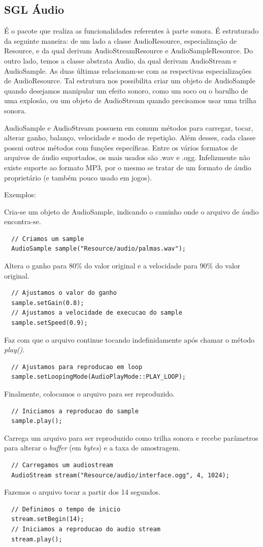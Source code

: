 \subsection{SGL Áudio}
%
%
É o pacote que realiza as funcionalidades referentes à parte sonora. É estruturado da seguinte maneira: de um lado a classe AudioResource, especialização de Resource, e da qual derivam AudioStreamResource e AudioSampleResource. Do outro lado, temos a classe abstrata Audio, da qual derivam AudioStream e AudioSample. As duas últimas relacionam-se com as respectivas especializações de AudioResource. Tal estrutura nos possibilita criar um objeto de AudioSample quando desejamos manipular um efeito sonoro, como um soco ou o barulho de uma explosão, ou um objeto de AudioStream quando precisamos usar uma trilha sonora.
\par 
AudioSample e AudioStream possuem em comum métodos para carregar, tocar, alterar ganho, balanço, velocidade e modo de repetição. Além desses, cada classe possui outros métodos com funções específicas. Entre os vários formatos de arquivos de áudio suportados, os mais usados são .wav e .ogg. Infelizmente não existe suporte ao formato MP3, por o mesmo se tratar de um formato de áudio proprietário (e também pouco usado em jogos).
\par
Exemplos:
\par 
Cria-se um objeto de  AudioSample, indicando o caminho onde o arquivo de áudio encontra-se.
%
\begin{lstlisting}
  // Criamos um sample
  AudioSample sample("Resource/audio/palmas.wav");
\end{lstlisting}
%
Altera o ganho para 80\% do valor original e a velocidade para 90\% do valor original.
%
\begin{lstlisting}
  // Ajustamos o valor do ganho
  sample.setGain(0.8);
  // Ajustamos a velocidade de execucao do sample
  sample.setSpeed(0.9);
\end{lstlisting}
%
Faz com que o arquivo continue tocando indefinidamente após chamar o método \textit{play()}.
%
\begin{lstlisting}
  // Ajustamos para reproducao em loop
  sample.setLoopingMode(AudioPlayMode::PLAY_LOOP);
\end{lstlisting}
%
Finalmente, colocamos o arquivo para ser reproduzido.
%
\begin{lstlisting}
  // Iniciamos a reproducao do sample
  sample.play();
\end{lstlisting}
%
%
Carrega um arquivo para ser reproduzido como trilha sonora e recebe parâmetros para alterar o \textit{buffer} (em \textit{bytes}) e a taxa de amostragem.
%
\begin{lstlisting}
  // Carregamos um audiostream
  AudioStream stream("Resource/audio/interface.ogg", 4, 1024);
\end{lstlisting}
%
Fazemos o arquivo tocar a partir dos 14 segundos.
%
\begin{lstlisting}
  // Definimos o tempo de inicio
  stream.setBegin(14);
  // Iniciamos a reproducao do audio stream
  stream.play();
\end{lstlisting}
%
%
%
